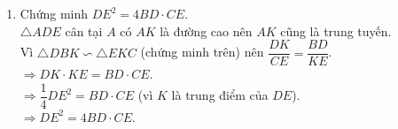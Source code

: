 \begin{bt}
{\begin{enumerate}
{
			}
			Xét $\triangle DBK$ và $\triangle EKC$ ta có\\
			$\widehat{DBK}=\widehat{ECK}=\beta$,\\
			$\widehat{BDK}=\widehat{CEK}=\alpha$.\\
			$\Rightarrow \triangle DBK \backsim \triangle EKC$ (g-g).
			\item Chứng minh $DE^2=4BD\cdot CE$.\\
			$\triangle ADE$ cân tại $A$ có $AK$ là đường cao nên $AK$ cũng là trung tuyến.\\
			Vì $\triangle DBK \backsim \triangle EKC$ (chứng minh trên) nên $\dfrac{DK}{CE}=\dfrac{BD}{KE}$.\\
			$\Rightarrow DK\cdot KE=BD\cdot CE$.\\
			$\Rightarrow \dfrac{1}{4}DE^2=BD\cdot CE$ (vì $K$ là trung điểm của $DE$).\\
			$\Rightarrow DE^2=4BD\cdot CE$.
		\end{enumerate}
	}
\end{bt}

